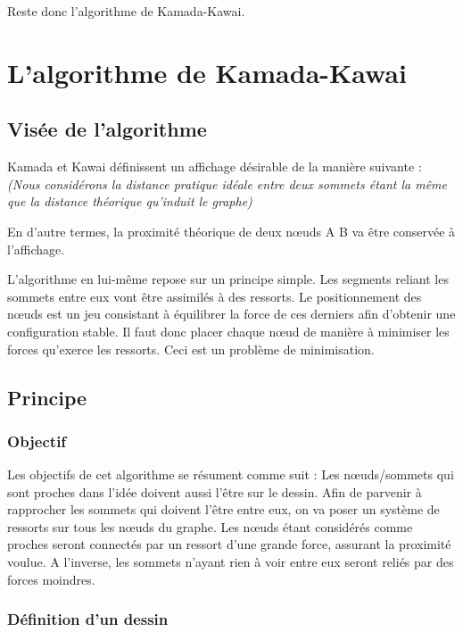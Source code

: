 \documentclass[a4paper,12pt]{article}
\begin{document}
Reste donc l’algorithme de Kamada-Kawai.

\section{L'algorithme de Kamada-Kawai}

\subsection{Visée de l'algorithme}

Kamada et Kawai définissent un affichage désirable de la manière suivante : 
\textit{(Nous considérons la distance pratique idéale entre deux sommets étant la même que la distance théorique qu’induit le graphe)}

En d’autre termes, la proximité théorique de deux nœuds A B va être conservée à l’affichage.

L’algorithme en lui-même repose sur un principe simple. Les segments reliant les sommets entre eux vont être assimilés à des ressorts. Le positionnement des nœuds est un jeu consistant à équilibrer la force de ces derniers afin d’obtenir une configuration stable. Il faut donc placer chaque nœud de manière à minimiser les forces qu’exerce les ressorts. Ceci est un problème de minimisation.

\subsection{Principe}

\subsubsection{Objectif}

Les objectifs de cet algorithme se résument comme suit : Les nœuds/sommets qui sont proches dans l’idée doivent aussi l’être sur le dessin. Afin de parvenir à rapprocher les sommets qui doivent l’être entre eux, on va poser un système de ressorts sur tous les nœuds du graphe. Les nœuds étant considérés comme proches seront connectés par un ressort d’une grande force, assurant la proximité voulue. A l’inverse, les sommets n’ayant rien à voir entre eux seront reliés par des forces moindres.

\subsubsection{Définition d'un dessin}
\end{document}
